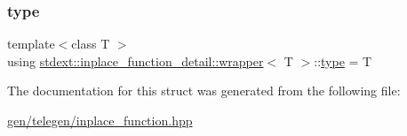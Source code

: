 \mbox{\label{structstdext_1_1inplace__function__detail_1_1wrapper_a8ffe3ee24387462eac3adb955deba564}} 
\subsubsection{\texorpdfstring{type}{type}\hspace{0.1cm}{\footnotesize\ttfamily [2/2]}}
{\footnotesize\ttfamily template$<$class T $>$ \\
using \hyperlink{structstdext_1_1inplace__function__detail_1_1wrapper}{stdext\+::inplace\+\_\+function\+\_\+detail\+::wrapper}$<$ T $>$\+::\hyperlink{structstdext_1_1inplace__function__detail_1_1wrapper_a8ffe3ee24387462eac3adb955deba564}{type} =  T}



The documentation for this struct was generated from the following file\+:\begin{DoxyCompactItemize}
\item 
\hyperlink{gen_2telegen_2inplace__function_8hpp}{gen/telegen/inplace\+\_\+function.\+hpp}\end{DoxyCompactItemize}
